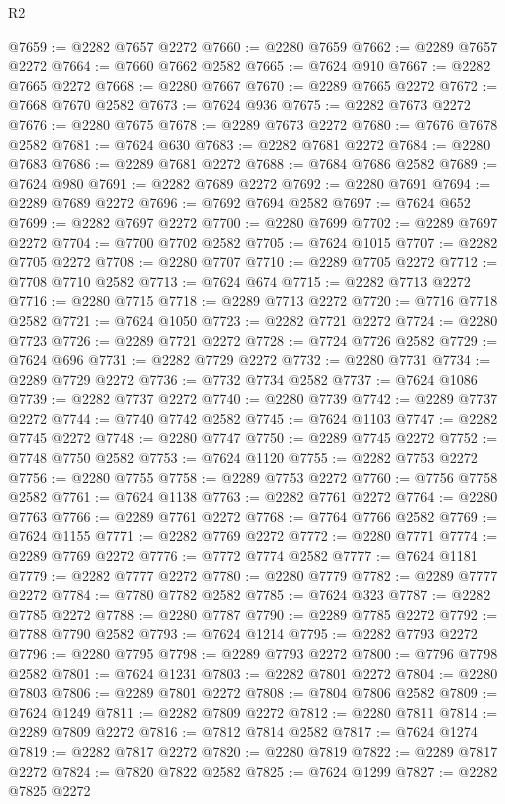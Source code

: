 \begin{lexlean}{R2}
\begin{coremodule}
@7659 := @2282 @7657 @2272
@7660 := @2280 @7659
@7662 := @2289 @7657 @2272
@7664 := @7660 @7662 @2582
@7665 := @7624 @910
@7667 := @2282 @7665 @2272
@7668 := @2280 @7667
@7670 := @2289 @7665 @2272
@7672 := @7668 @7670 @2582
@7673 := @7624 @936
@7675 := @2282 @7673 @2272
@7676 := @2280 @7675
@7678 := @2289 @7673 @2272
@7680 := @7676 @7678 @2582
@7681 := @7624 @630
@7683 := @2282 @7681 @2272
@7684 := @2280 @7683
@7686 := @2289 @7681 @2272
@7688 := @7684 @7686 @2582
@7689 := @7624 @980
@7691 := @2282 @7689 @2272
@7692 := @2280 @7691
@7694 := @2289 @7689 @2272
@7696 := @7692 @7694 @2582
@7697 := @7624 @652
@7699 := @2282 @7697 @2272
@7700 := @2280 @7699
@7702 := @2289 @7697 @2272
@7704 := @7700 @7702 @2582
@7705 := @7624 @1015
@7707 := @2282 @7705 @2272
@7708 := @2280 @7707
@7710 := @2289 @7705 @2272
@7712 := @7708 @7710 @2582
@7713 := @7624 @674
@7715 := @2282 @7713 @2272
@7716 := @2280 @7715
@7718 := @2289 @7713 @2272
@7720 := @7716 @7718 @2582
@7721 := @7624 @1050
@7723 := @2282 @7721 @2272
@7724 := @2280 @7723
@7726 := @2289 @7721 @2272
@7728 := @7724 @7726 @2582
@7729 := @7624 @696
@7731 := @2282 @7729 @2272
@7732 := @2280 @7731
@7734 := @2289 @7729 @2272
@7736 := @7732 @7734 @2582
@7737 := @7624 @1086
@7739 := @2282 @7737 @2272
@7740 := @2280 @7739
@7742 := @2289 @7737 @2272
@7744 := @7740 @7742 @2582
@7745 := @7624 @1103
@7747 := @2282 @7745 @2272
@7748 := @2280 @7747
@7750 := @2289 @7745 @2272
@7752 := @7748 @7750 @2582
@7753 := @7624 @1120
@7755 := @2282 @7753 @2272
@7756 := @2280 @7755
@7758 := @2289 @7753 @2272
@7760 := @7756 @7758 @2582
@7761 := @7624 @1138
@7763 := @2282 @7761 @2272
@7764 := @2280 @7763
@7766 := @2289 @7761 @2272
@7768 := @7764 @7766 @2582
@7769 := @7624 @1155
@7771 := @2282 @7769 @2272
@7772 := @2280 @7771
@7774 := @2289 @7769 @2272
@7776 := @7772 @7774 @2582
@7777 := @7624 @1181
@7779 := @2282 @7777 @2272
@7780 := @2280 @7779
@7782 := @2289 @7777 @2272
@7784 := @7780 @7782 @2582
@7785 := @7624 @323
@7787 := @2282 @7785 @2272
@7788 := @2280 @7787
@7790 := @2289 @7785 @2272
@7792 := @7788 @7790 @2582
@7793 := @7624 @1214
@7795 := @2282 @7793 @2272
@7796 := @2280 @7795
@7798 := @2289 @7793 @2272
@7800 := @7796 @7798 @2582
@7801 := @7624 @1231
@7803 := @2282 @7801 @2272
@7804 := @2280 @7803
@7806 := @2289 @7801 @2272
@7808 := @7804 @7806 @2582
@7809 := @7624 @1249
@7811 := @2282 @7809 @2272
@7812 := @2280 @7811
@7814 := @2289 @7809 @2272
@7816 := @7812 @7814 @2582
@7817 := @7624 @1274
@7819 := @2282 @7817 @2272
@7820 := @2280 @7819
@7822 := @2289 @7817 @2272
@7824 := @7820 @7822 @2582
@7825 := @7624 @1299
@7827 := @2282 @7825 @2272

\end{coremodule}
\end{lexlean}
